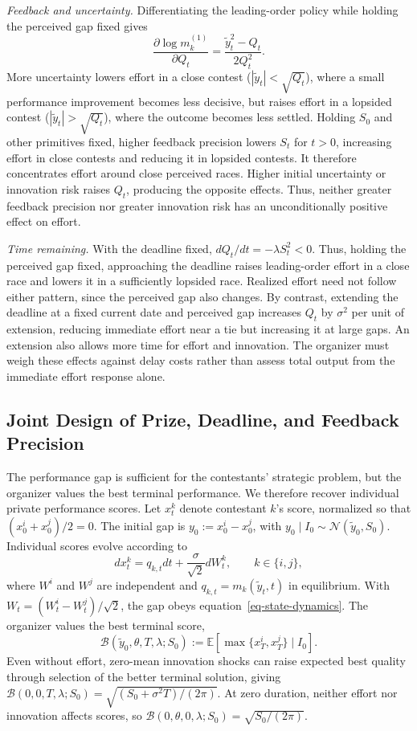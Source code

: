 \documentclass[mnsc]{informs3}
\begin{document}
\textit{Feedback and uncertainty.} Differentiating the leading-order policy while holding the perceived gap fixed gives
\[
\frac{\partial\log m_k^{(1)}}{\partial Q_t}
=\frac{\tilde y_t^2-Q_t}{2Q_t^2}.
\]
More uncertainty lowers effort in a close contest ($|\tilde y_t|<\sqrt{Q_t}$), where a small performance improvement becomes less decisive, but raises effort in a lopsided contest ($|\tilde y_t|>\sqrt{Q_t}$), where the outcome becomes less settled. Holding $S_0$ and other primitives fixed, higher feedback precision lowers $S_t$ for $t>0$, increasing effort in close contests and reducing it in lopsided contests. It therefore concentrates effort around close perceived races. Higher initial uncertainty or innovation risk raises $Q_t$, producing the opposite effects. Thus, neither greater feedback precision nor greater innovation risk has an unconditionally positive effect on effort.

\textit{Time remaining.} With the deadline fixed, $dQ_t/dt=-\lambda S_t^2<0$. Thus, holding the perceived gap fixed, approaching the deadline raises leading-order effort in a close race and lowers it in a sufficiently lopsided race. Realized effort need not follow either pattern, since the perceived gap also changes. By contrast, extending the deadline at a fixed current date and perceived gap increases $Q_t$ by $\sigma^2$ per unit of extension, reducing immediate effort near a tie but increasing it at large gaps. An extension also allows more time for effort and innovation. The organizer must weigh these effects against delay costs rather than assess total output from the immediate effort response alone.

\subsection{{Joint Design of Prize, Deadline, and Feedback Precision}}\label{sect-design}


The performance gap is sufficient for the contestants' strategic problem, but the organizer values the best terminal performance. We therefore recover individual private performance scores. Let $x_t^k$ denote contestant $k$'s score, normalized so that $(x_0^i+x_0^j)/2=0$. The initial gap is $y_0:=x_0^i-x_0^j$, with $y_0\mid I_0\sim\mathcal N(\tilde y_0,S_0)$.
Individual scores evolve according to
\begin{equation}\label{eq-individual-output-dynamics}
dx_t^k=q_{k,t}dt+\frac{\sigma}{\sqrt2}dW_t^k,
\qquad k\in\{i,j\},
\end{equation}
where $W^i$ and $W^j$ are independent and $q_{k,t}=m_k(\tilde y_t,t)$ in equilibrium. With $W_t=(W_t^i-W_t^j)/\sqrt2$, the gap obeys equation~\eqref{eq-state-dynamics}. The organizer values the best terminal score,
\[
\mathcal B(\tilde y_0,\theta,T,\lambda;S_0)
:=\mathbb E[\max\{x_T^i,x_T^j\}\mid I_0].
\]
Even without effort, zero-mean innovation shocks can raise expected best quality through selection of the better terminal solution, giving $\mathcal B(0,0,T,\lambda;S_0)=\sqrt{(S_0+\sigma^2T)/(2\pi)}$. At zero duration, neither effort nor innovation affects scores, so $\mathcal B(0,\theta,0,\lambda;S_0)=\sqrt{S_0/(2\pi)}$.
\end{document}
